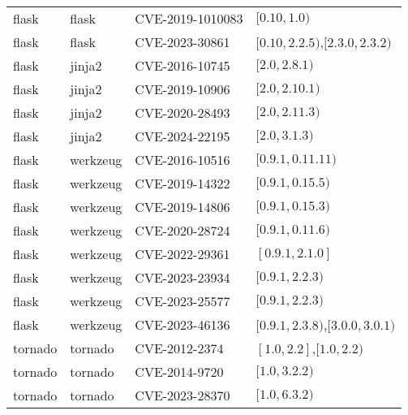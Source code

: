\begin{tabular}{llll}
flask & flask & CVE-2019-1010083 & $[0.10,1.0)$ \\
flask & flask & CVE-2023-30861 & $[0.10,2.2.5)$,$[2.3.0,2.3.2)$ \\
flask & jinja2 & CVE-2016-10745 & $[2.0,2.8.1)$ \\
flask & jinja2 & CVE-2019-10906 & $[2.0,2.10.1)$ \\
flask & jinja2 & CVE-2020-28493 & $[2.0,2.11.3)$ \\
flask & jinja2 & CVE-2024-22195 & $[2.0,3.1.3)$ \\
flask & werkzeug & CVE-2016-10516 & $[0.9.1,0.11.11)$ \\
flask & werkzeug & CVE-2019-14322 & $[0.9.1,0.15.5)$ \\
flask & werkzeug & CVE-2019-14806 & $[0.9.1,0.15.3)$ \\
flask & werkzeug & CVE-2020-28724 & $[0.9.1,0.11.6)$ \\
flask & werkzeug & CVE-2022-29361 & $[0.9.1,2.1.0]$ \\
flask & werkzeug & CVE-2023-23934 & $[0.9.1,2.2.3)$ \\
flask & werkzeug & CVE-2023-25577 & $[0.9.1,2.2.3)$ \\
flask & werkzeug & CVE-2023-46136 & $[0.9.1,2.3.8)$,$[3.0.0,3.0.1)$ \\
tornado & tornado & CVE-2012-2374 & $[1.0,2.2]$,$[1.0,2.2)$ \\
tornado & tornado & CVE-2014-9720 & $[1.0,3.2.2)$ \\
tornado & tornado & CVE-2023-28370 & $[1.0,6.3.2)$ \\
\bottomrule
\end{tabular}

